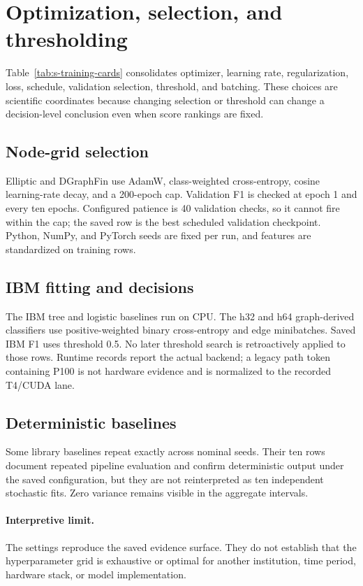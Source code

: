 \section{Optimization, selection, and thresholding}
\label{sec:s-optimization}

Table~\ref{tab:s-training-cards} consolidates optimizer, learning rate, regularization, loss, schedule, validation selection, threshold, and batching. These choices are scientific coordinates because changing selection or threshold can change a decision-level conclusion even when score rankings are fixed.



\subsection{Node-grid selection}

Elliptic and DGraphFin use AdamW, class-weighted cross-entropy, cosine learning-rate decay, and a 200-epoch cap. Validation F1 is checked at epoch 1 and every ten epochs. Configured patience is 40 validation checks, so it cannot fire within the cap; the saved row is the best scheduled validation checkpoint. Python, NumPy, and PyTorch seeds are fixed per run, and features are standardized on training rows.

\subsection{IBM fitting and decisions}

The IBM tree and logistic baselines run on CPU. The h32 and h64 graph-derived classifiers use positive-weighted binary cross-entropy and edge minibatches. Saved IBM F1 uses threshold 0.5. No later threshold search is retroactively applied to those rows. Runtime records report the actual backend; a legacy path token containing P100 is not hardware evidence and is normalized to the recorded T4/CUDA lane.

\subsection{Deterministic baselines}

Some library baselines repeat exactly across nominal seeds. Their ten rows document repeated pipeline evaluation and confirm deterministic output under the saved configuration, but they are not reinterpreted as ten independent stochastic fits. Zero variance remains visible in the aggregate intervals.

\paragraph{Interpretive limit.}
The settings reproduce the saved evidence surface. They do not establish that the hyperparameter grid is exhaustive or optimal for another institution, time period, hardware stack, or model implementation.
